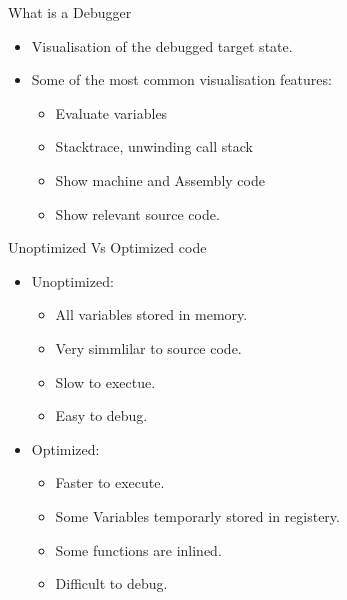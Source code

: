 
\begin{frame}{What is a Debugger}
    \begin{itemize}
        \item Visualisation of the debugged target state.
        \item Some of the most common visualisation features:
    	\begin{itemize}
    	    \item Evaluate variables
    	    \item Stacktrace, unwinding call stack
    	    \item Show machine and Assembly code
    	    \item Show relevant source code.
    	\end{itemize}
    \end{itemize}
\end{frame}


\begin{frame}{Unoptimized Vs Optimized code}
    \begin{itemize}
        \item Unoptimized:
    	\begin{itemize}
    	    \item All variables stored in memory.
    	    \item Very simmlilar to source code.
    	    \item Slow to exectue.
    	    \item Easy to debug.
    	\end{itemize}
        \item Optimized:
    	\begin{itemize}
    	    \item Faster to execute.
    	    \item Some Variables temporarly stored in registery.
    	    \item Some functions are inlined.
    	    \item Difficult to debug.
    	\end{itemize}
    \end{itemize}
\end{frame}

